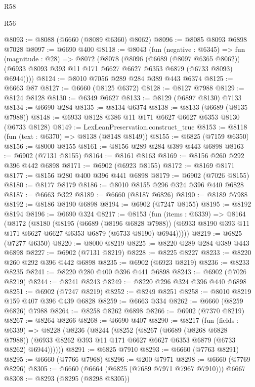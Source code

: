 \begin{lexlean}{R58}
\begin{lexlean}{R56}
\begin{coremodule}
{{{{{{{{{{{{{{{{{{{{{{{{{{{{{{{{{{{{{{{{{{{{{{{{{{{{{{{{{{{{{{{{{{{{{{{{{{{{{{{{{{{{{{{{{{{{{{{{{{{{{{{{{{{{{{{{{{{{{{{{{{{{{{{{{{{{{{{{{{{{{{{{{{{{{{{{{{{{{{{{{{{{{{{{{{{{{{{{{{{{{{{{{{{{{{{{{{{{{{{{{{{{{{{{{{{@8093 := @8088 (@6660 (@8089 @6360) @8062)
@8096 := @8085 @8093 @6898 @7028
@8097 := @6690 @400
@8118 := @8043
    (fun (negative : @6345) =>
    fun (magnitude : @28) =>
    @8072
      (@8078
        (@8096
          (@6689 (@8097 @6365 @8062))
          (@6933 @8093 @393 @11 @171 @6627 @6627 @6353 @6879 (@6733 @8093) @6944))))
@8124 := @8010 @7056 @289 @284 @389 @443 @6374
@8125 := @6663 @87
@8127 := @6660 (@8125 @6372)
@8128 := @8127 @7988
@8129 := @8124 @8128
@8130 := @6349 @6627
@8133 := @8129 (@6897 @8130) @7133
@8134 := @6690 @284
@8135 := @8134 @6374
@8138 := @8133 (@6689 (@8135 @7988))
@8148 := @6933 @8128 @386 @11 @171 @6627 @6627 @6353 @8130 (@6733 @8128)
@8149 := LexLeanPreservation.construct_true
@8153 := @8118 (fun (text : @6370) => @8138 (@8148 @8149))
@8155 := @6825 (@7159 @6350)
@8156 := @8000 @8155
@8161 := @8156 @289 @284 @389 @443 @6898
@8163 := @6902 (@7131 @8155)
@8164 := @8161 @8163
@8169 := @8156 @260 @292 @396 @442 @6898
@8171 := @6902 (@6923 @8155)
@8172 := @8169 @8171
@8177 := @8156 @280 @400 @396 @441 @6898
@8179 := @6902 (@7026 @8155)
@8180 := @8177 @8179
@8186 := @8010 @8155 @296 @324 @396 @440 @6828
@8187 := @6663 @322
@8189 := @6660 (@8187 @6826)
@8190 := @8189 @7988
@8192 := @8186 @8190 @6898
@8194 := @6902 (@7247 @8155)
@8195 := @8192 @8194
@8196 := @6690 @324
@8217 := @8153
    (fun (items : @6339) =>
    @8164
      (@8172
        (@8180
          (@8195
            (@6689 (@8196 @6828 @7988))
            (@6933 @8190 @393 @11 @171 @6627 @6627 @6353 @6879 (@6733 @8190) @6944)))))
@8219 := @6825 (@7277 @6350)
@8220 := @8000 @8219
@8225 := @8220 @289 @284 @389 @443 @6898
@8227 := @6902 (@7131 @8219)
@8228 := @8225 @8227
@8233 := @8220 @260 @292 @396 @442 @6898
@8235 := @6902 (@6923 @8219)
@8236 := @8233 @8235
@8241 := @8220 @280 @400 @396 @441 @6898
@8243 := @6902 (@7026 @8219)
@8244 := @8241 @8243
@8249 := @8220 @296 @324 @396 @440 @6898
@8251 := @6902 (@7247 @8219)
@8252 := @8249 @8251
@8258 := @8010 @8219 @159 @407 @396 @439 @6828
@8259 := @6663 @334
@8262 := @6660 (@8259 @6826) @7988
@8264 := @8258 @8262 @6898
@8266 := @6902 (@7370 @8219)
@8267 := @8264 @8266
@8268 := @6690 @407
@8290 := @8217
    (fun (fields : @6339) =>
    @8228
      (@8236
        (@8244
          (@8252
            (@8267
              (@6689 (@8268 @6828 @7988))
              (@6933 @8262 @393 @11 @171 @6627 @6627 @6353 @6879 (@6733 @8262) @6944))))))
@8291 := @6825 @7910
@8293 := @6660 (@7763 @8291)
@8295 := @6660 (@7766 @7968)
@8296 := @200 @7971
@8298 := @6660 (@7769 @8296)
@8305 := @6660 (@6664 (@6825 (@7689 @7971 @7967 @7910))) @6667
@8308 := @8293 (@8295 (@8298 @8305))
}}}}}}}}}}}}}}}}}}}}}}}}}}}}}}}}}}}}}}}}}}}}}}}}}}}}}}}}}}}}}}}}}}}}}}}}}}}}}}}}}}}}}}}}}}}}}}}}}}}}}}}}}}}}}}}}}}}}}}}}}}}}}}}}}}}}}}}}}}}}}}}}}}}}}}}}}}}}}}}}}}}}}}}}}}}}}}}}}}}}}}}}}}}}}}}}}}}}}}}}}}}}}}}}}}}
\end{coremodule}
\end{lexlean}
\end{lexlean}

